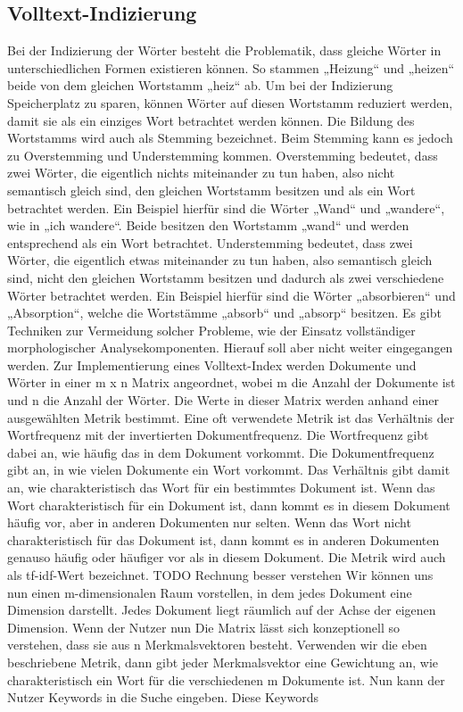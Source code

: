 \subsection*{Volltext-Indizierung}
Bei der Indizierung der Wörter besteht die Problematik, dass gleiche Wörter in unterschiedlichen Formen existieren können. So stammen „Heizung“ und „heizen“ beide von dem gleichen Wortstamm „heiz“ ab. Um bei der Indizierung Speicherplatz zu sparen, können Wörter auf diesen Wortstamm reduziert werden, damit sie als ein einziges Wort betrachtet werden können. Die Bildung des Wortstamms wird auch als Stemming bezeichnet. Beim Stemming kann es jedoch zu Overstemming und Understemming kommen. Overstemming bedeutet, dass zwei Wörter, die eigentlich nichts miteinander zu tun haben, also nicht semantisch gleich sind, den gleichen Wortstamm besitzen und als ein Wort betrachtet werden. Ein Beispiel hierfür sind die Wörter „Wand“ und „wandere“, wie in „ich wandere“. Beide besitzen den Wortstamm „wand“ und werden entsprechend als ein Wort betrachtet. Understemming bedeutet, dass zwei Wörter, die eigentlich etwas miteinander zu tun haben, also semantisch gleich sind, nicht den gleichen Wortstamm besitzen und dadurch als zwei verschiedene Wörter betrachtet werden. Ein Beispiel hierfür sind die Wörter „absorbieren“ und „Absorption“, welche die Wortstämme „absorb“ und „absorp“ besitzen. Es gibt Techniken zur Vermeidung solcher Probleme, wie der Einsatz vollständiger morphologischer Analysekomponenten. Hierauf soll aber nicht weiter eingegangen werden.
Zur Implementierung eines Volltext-Index werden Dokumente und Wörter in einer m x n Matrix angeordnet, wobei m die Anzahl der Dokumente ist und n die Anzahl der Wörter. Die Werte in dieser Matrix werden anhand einer ausgewählten Metrik bestimmt. Eine oft verwendete Metrik ist das Verhältnis der Wortfrequenz mit der invertierten Dokumentfrequenz. Die Wortfrequenz gibt dabei an, wie häufig das in dem Dokument vorkommt. Die Dokumentfrequenz gibt an, in wie vielen Dokumente ein Wort vorkommt. Das Verhältnis gibt damit an, wie charakteristisch das Wort für ein bestimmtes Dokument ist. Wenn das Wort charakteristisch für ein Dokument ist, dann kommt es in diesem Dokument häufig vor, aber in anderen Dokumenten nur selten. Wenn das Wort nicht charakteristisch für das Dokument ist, dann kommt es in anderen Dokumenten genauso häufig oder häufiger vor als in diesem Dokument. Die Metrik wird auch als tf-idf-Wert bezeichnet.
TODO Rechnung besser verstehen
Wir können uns nun einen m-dimensionalen Raum vorstellen, in dem jedes Dokument eine Dimension darstellt. Jedes Dokument liegt räumlich auf der Achse der eigenen Dimension. Wenn der Nutzer nun 
Die Matrix lässt sich konzeptionell so verstehen, dass sie aus n Merkmalsvektoren besteht. Verwenden wir die eben beschriebene Metrik, dann gibt jeder Merkmalsvektor eine Gewichtung an, wie charakteristisch ein Wort für die verschiedenen m Dokumente ist. Nun kann der Nutzer Keywords in die Suche eingeben. Diese Keywords 

